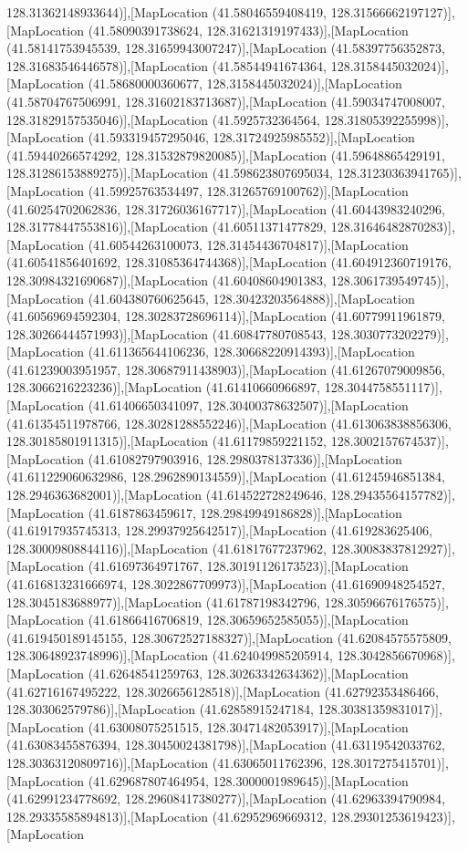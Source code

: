 128.31362148933644)],[MapLocation (41.58046559408419, 128.31566662197127)],[MapLocation (41.58090391738624, 128.31621319197433)],[MapLocation (41.58141753945539, 128.31659943007247)],[MapLocation (41.58397756352873, 128.31683546446578)],[MapLocation (41.58544941674364, 128.3158445032024)],[MapLocation (41.58680000360677, 128.3158445032024)],[MapLocation (41.58704767506991, 128.31602183713687)],[MapLocation (41.59034747008007, 128.31829157535046)],[MapLocation (41.5925732364564, 128.31805392255998)],[MapLocation (41.593319457295046, 128.31724925985552)],[MapLocation (41.59440266574292, 128.31532879820085)],[MapLocation (41.59648865429191, 128.31286153889275)],[MapLocation (41.598623807695034, 128.31230363941765)],[MapLocation (41.59925763534497, 128.31265769100762)],[MapLocation (41.60254702062836, 128.31726036167717)],[MapLocation (41.60443983240296, 128.31778447553816)],[MapLocation (41.60511371477829, 128.31646482870283)],[MapLocation (41.60544263100073, 128.31454436704817)],[MapLocation (41.60541856401692, 128.31085364744368)],[MapLocation (41.604912360719176, 128.30984321690687)],[MapLocation (41.60408604901383, 128.3061739549745)],[MapLocation (41.604380760625645, 128.30423203564888)],[MapLocation (41.60569694592304, 128.30283728696114)],[MapLocation (41.60779911961879, 128.30266444571993)],[MapLocation (41.60847780708543, 128.3030773202279)],[MapLocation (41.611365644106236, 128.30668220914393)],[MapLocation (41.61239003951957, 128.30687911438903)],[MapLocation (41.61267079009856, 128.3066216223236)],[MapLocation (41.61410660966897, 128.3044758551117)],[MapLocation (41.61406650341097, 128.30400378632507)],[MapLocation (41.61354511978766, 128.30281288552246)],[MapLocation (41.613063838856306, 128.30185801911315)],[MapLocation (41.61179859221152, 128.3002157674537)],[MapLocation (41.61082797903916, 128.2980378137336)],[MapLocation (41.611229060632986, 128.2962890134559)],[MapLocation (41.61245946851384, 128.2946363682001)],[MapLocation (41.614522728249646, 128.29435564157782)],[MapLocation (41.6187863459617, 128.29849949186828)],[MapLocation (41.61917935745313, 128.29937925642517)],[MapLocation (41.619283625406, 128.30009808844116)],[MapLocation (41.61817677237962, 128.30083837812927)],[MapLocation (41.61697364971767, 128.30191126173523)],[MapLocation (41.616813231666974, 128.3022867709973)],[MapLocation (41.61690948254527, 128.3045183688977)],[MapLocation (41.61787198342796, 128.30596676176575)],[MapLocation (41.61866416706819, 128.30659652585055)],[MapLocation (41.619450189145155, 128.30672527188327)],[MapLocation (41.62084575575809, 128.30648923748996)],[MapLocation (41.624049985205914, 128.3042856670968)],[MapLocation (41.62648541259763, 128.30263342634362)],[MapLocation (41.62716167495222, 128.3026656128518)],[MapLocation (41.62792353486466, 128.303062579786)],[MapLocation (41.62858915247184, 128.30381359831017)],[MapLocation (41.63008075251515, 128.30471482053917)],[MapLocation (41.63083455876394, 128.30450024381798)],[MapLocation (41.63119542033762, 128.30363120809716)],[MapLocation (41.63065011762396, 128.3017275415701)],[MapLocation (41.629687807464954, 128.3000001989645)],[MapLocation (41.62991234778692, 128.29608417380277)],[MapLocation (41.62963394790984, 128.29335585894813)],[MapLocation (41.62952969669312, 128.29301253619423)],[MapLocation 